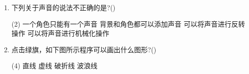 \documentclass[10pt, a4paper]{article}
\begin{document}
\begin{enumerate}
        \item 下列关于声音的说法不正确的是?(\qquad)
        \begin{tasks}(2)
            \task 一个角色只能有一个声音
            \task 背景和角色都可以添加声音
            \task 可以将声音进行反转操作
            \task 可以将声音进行机械化操作
        \end{tasks}

        \item 点击绿旗，如下图所示程序可以画出什么图形?(\qquad)
        \begin{tasks}(4)
            \task 直线
            \task 虚线
            \task 破折线
            \task 波浪线
        \end{tasks}
    \end{enumerate}
\end{document}
